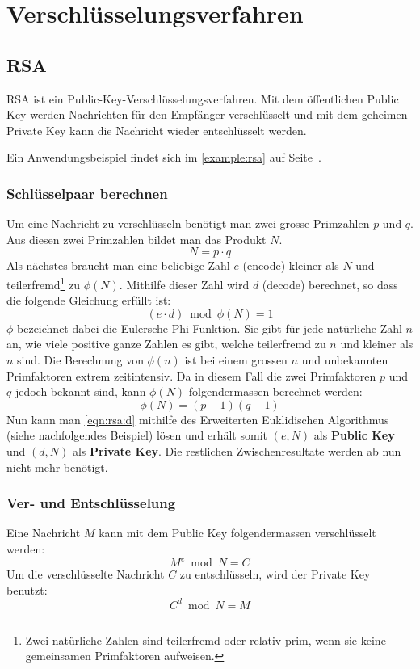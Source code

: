\section{Verschlüsselungsverfahren}

\subsection{RSA}

RSA ist ein Public-Key-Verschlüsselungsverfahren. Mit dem öffentlichen Public
Key werden Nachrichten für den Empfänger verschlüsselt und mit dem geheimen
Private Key kann die Nachricht wieder entschlüsselt werden.

Ein Anwendungsbeispiel findet sich im \autoref{example:rsa} auf
Seite~\pageref{example:rsa}.

\subsubsection*{Schlüsselpaar berechnen}

Um eine Nachricht zu verschlüsseln benötigt man zwei grosse Primzahlen $p$ und
$q$. Aus diesen zwei Primzahlen bildet man das Produkt $N$.
\begin{equation}
	\label{eqn:rsa:N}
	N = p \cdot q
\end{equation}
Als nächstes braucht man eine beliebige Zahl $e$ (encode) kleiner als $N$ und
teilerfremd\footnote{Zwei natürliche Zahlen sind teilerfremd oder relativ prim,
wenn sie keine gemeinsamen Primfaktoren aufweisen.} zu $\phi(N)$. Mithilfe
dieser Zahl wird $d$ (decode) berechnet, so dass die folgende Gleichung erfüllt
ist:
\begin{equation}
	\label{eqn:rsa:d}
	(e \cdot d) \bmod \phi(N) = 1
\end{equation}
$\phi$ bezeichnet dabei die Eulersche Phi-Funktion. Sie gibt für jede natürliche
Zahl $n$ an, wie viele positive ganze Zahlen es gibt, welche teilerfremd zu $n$
und kleiner als $n$ sind. Die Berechnung von $\phi(n)$ ist bei einem grossen $n$
und unbekannten Primfaktoren extrem zeitintensiv. Da in diesem Fall die zwei
Primfaktoren $p$ und $q$ jedoch bekannt sind, kann $\phi(N)$ folgendermassen
berechnet werden:
\begin{equation}
	\phi(N) = (p-1)(q-1)
\end{equation}
Nun kann man \eqref{eqn:rsa:d} mithilfe des Erweiterten Euklidischen Algorithmus
(siehe nachfolgendes Beispiel) lösen und erhält somit $(e,N)$ als \textbf{Public
Key} und $(d,N)$ als \textbf{Private Key}. Die restlichen Zwischenresultate
werden ab nun nicht mehr benötigt.

\subsubsection*{Ver- und Entschlüsselung}

Eine Nachricht $M$ kann mit dem Public Key folgendermassen verschlüsselt werden:
\begin{equation}
	M^e \bmod N = C
\end{equation}
Um die verschlüsselte Nachricht $C$ zu entschlüsseln, wird der Private Key
benutzt:
\begin{equation}
	C^d \bmod N = M
\end{equation}
